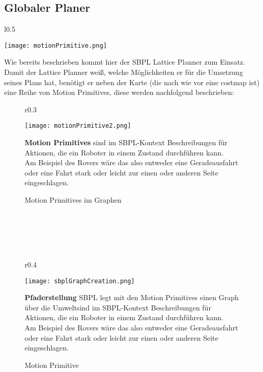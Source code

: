 \documentclass[oribibl]{llncs}
\begin{document}
\subsection{Globaler Planer}
\begin{wrapfigure}[12]{l}{0.5\textwidth}
  \begin{center}
  \vspace{-30pt}
    \texttt{[image: motionPrimitive.png]}
    \caption{Motion Primitive}
	\cite{SBPLRosSchool}
  \end{center}
\end{wrapfigure}
Wie bereits beschrieben kommt hier der SBPL Lattice Planner zum Einsatz.\\
Damit der Lattice Planner weiß, welche Möglichkeiten er für die Umsetzung seines Plans hat, benötigt er neben der Karte (die nach wie vor eine costmap ist) eine Reihe von Motion Primitives, diese werden nachfolgend beschrieben:\\
\begin{figure}
\begin{wrapfigure}[12]{r}{0.3\textwidth}
  \begin{center}
  \vspace{-30pt}
    \texttt{[image: motionPrimitive2.png]}
    \caption{Motion Primitives im Graphen}
	\cite{SBPLRosSchool}
  \end{center}
\end{wrapfigure}
\textbf{Motion Primitives} sind im SBPL-Kontext Beschreibungen für Aktionen, die ein Roboter in einem Zustand durchführen kann.\\
Am Beispiel des Rovers wäre das also entweder eine Geradeausfahrt oder eine Fahrt stark oder leicht zur einen oder anderen Seite eingeschlagen.
\end{figure}
\\\\\\\\
\begin{figure}
\begin{wrapfigure}[12]{r}{0.4\textwidth}
  \begin{center}
  \vspace{-20pt}
    \texttt{[image: sbplGraphCreation.png]}
    \caption{Motion Primitive}
	\cite{SBPLRosSchool}
  \end{center}
\end{wrapfigure}
\textbf{Pfaderstellung} SBPL legt mit den Motion Primitives einen Graph über die Umweltsind im SBPL-Kontext Beschreibungen für Aktionen, die ein Roboter in einem Zustand durchführen kann.\\
Am Beispiel des Rovers wäre das also entweder eine Geradeausfahrt oder eine Fahrt stark oder leicht zur einen oder anderen Seite eingeschlagen.
\end{figure}
\newpage
\end{document}
